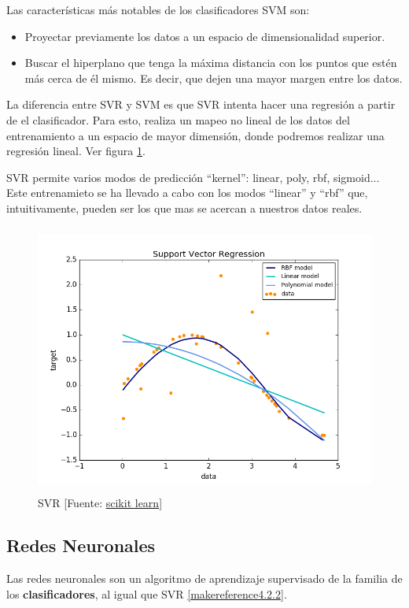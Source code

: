 	Las características más notables de los clasificadores SVM son:
	\begin{itemize}
		\item Proyectar previamente los datos a un espacio de dimensionalidad superior.
		\item Buscar el hiperplano que tenga la máxima distancia con los puntos que estén más cerca de él mismo. Es decir, que dejen una mayor margen entre los datos.
	\end{itemize}

	La diferencia entre SVR y SVM es que SVR intenta hacer una regresión a partir de el clasificador. Para esto, realiza un mapeo no lineal de los datos del entrenamiento a un espacio de mayor dimensión, donde podremos realizar una regresión lineal. Ver figura \ref{svr}.

	SVR permite varios modos de predicción ``kernel'': linear, poly, rbf, sigmoid...
	Este entrenamieto se ha llevado a cabo con los modos ``linear'' y ``rbf'' que, intuitivamente, pueden ser los que mas se acercan a nuestros datos reales.

	\begin{figure}[htb]
		\begin{center}
			\includegraphics[height=3.5in]{figures/svr.png}
			\caption{SVR [Fuente: \href{http://scikit-learn.org/stable/auto_examples/svm/plot_svm_regression.html}{scikit learn}] }
		\end{center}
		\label{svr}
	\end{figure}
	
	\subsection{Redes Neuronales}
	\label{makereference4.2.3}
	Las redes neuronales son un algoritmo de aprendizaje supervisado de la familia de los \textbf{clasificadores}, al igual que SVR \ref{makereference4.2.2}.

